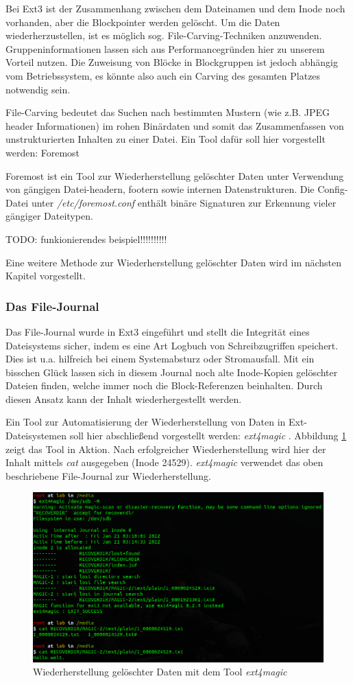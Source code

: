 Bei Ext3 ist der Zusammenhang zwischen dem Dateinamen und dem Inode noch vorhanden, aber die Blockpointer werden gelöscht. Um die Daten wiederherzustellen, ist es möglich  sog. File-Carving-Techniken anzuwenden. Gruppeninformationen lassen sich aus Performancegründen hier zu unserem Vorteil nutzen. Die Zuweisung von Blöcke in Blockgruppen ist jedoch abhängig vom Betriebssystem, es könnte also auch ein Carving des gesamten Platzes notwendig sein.

File-Carving bedeutet das Suchen nach bestimmten Mustern (wie z.B. JPEG header Informationen) im rohen Binärdaten und somit das Zusammenfassen von unstrukturierten Inhalten zu einer Datei.
Ein Tool dafür soll hier vorgestellt werden: Foremost \cite{Foremost.07.01.2022}

Foremost ist ein Tool zur Wiederherstellung gelöschter Daten unter Verwendung von gängigen Datei-headern, footern sowie internen Datenstrukturen. Die Config-Datei unter \textit{/etc/foremost.conf} enthält binäre Signaturen zur Erkennung vieler gängiger Dateitypen.

TODO: funkionierendes beispiel!!!!!!!!!!

Eine weitere Methode zur Wiederherstellung gelöschter Daten wird im nächsten Kapitel vorgestellt.

\subsubsection{Das File-Journal}

Das File-Journal wurde in Ext3 eingeführt und stellt die Integrität eines Dateisystems sicher, indem es eine Art Logbuch von Schreibzugriffen speichert. Dies ist u.a. hilfreich bei einem Systemabsturz oder Stromausfall. Mit ein bisschen Glück lassen sich in diesem Journal noch alte Inode-Kopien gelöschter Dateien finden, welche immer noch die Block-Referenzen beinhalten. Durch diesen Ansatz kann der Inhalt wiederhergestellt werden.

Ein Tool zur Automatisierung der Wiederherstellung von Daten in Ext-Dateisystemen soll hier abschließend vorgestellt werden: \textit{ext4magic} \cite{Ext4magic.07.01.2022}.
Abbildung \ref{fig:ext4magic} zeigt das Tool in Aktion. Nach erfolgreicher Wiederherstellung wird hier der Inhalt mittels \textit{cat} ausgegeben (Inode 24529). \textit{ext4magic} verwendet das oben beschriebene File-Journal zur Wiederherstellung.

\begin{figure}[H]
	\centering
	\includegraphics[width=12cm,keepaspectratio=true]{pictures/ext4magic-recovery.png}
	\caption{
		Wiederherstellung gelöschter Daten mit dem Tool \textit{ext4magic} \cite{Ext4magic.07.01.2022}
	}
	\label{fig:ext4magic}
\end{figure}